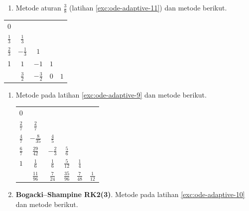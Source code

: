 \begin{enumerate}
\begin{enumerate}
\begin{center}
\begin{tabular}{c|ccc}
0 &  &  & \tabularnewline
$\frac{1}{3}$ & $\frac{1}{3}$ &  & \tabularnewline
$\frac{2}{3}$ & $-\frac{1}{3}$ & $1$ & \tabularnewline
\hline 
 & $0$ & $\frac{1}{2}$ & $\frac{1}{2}$\tabularnewline
\end{tabular}
\par\end{center}
\item \label{exc:ode-adaptive-18}Metode aturan $\frac{3}{8}$ (latihan
\ref{exc:ode-adaptive-11}) dan metode berikut.
\end{enumerate}
\begin{center}
\begin{tabular}{c|cccc}
0 &  &  &  & \tabularnewline
$\frac{1}{3}$ & $\frac{1}{3}$ &  &  & \tabularnewline
$\frac{2}{3}$ & $-\frac{1}{3}$ & $1$ &  & \tabularnewline
1 & $1$ & $-1$ & $1$ & \tabularnewline
\hline 
 & $\frac{3}{2}$ & $-\frac{3}{2}$ & $0$ & $1$\tabularnewline
\end{tabular}
\par\end{center}
\begin{enumerate}
\item \label{exc:ode-adaptive-19}Metode pada latihan \ref{exc:ode-adaptive-9}
dan metode berikut.

\begin{center}
\begin{tabular}{c|ccccc}
0 &  &  &  &  & \tabularnewline
$\frac{2}{7}$ & $\frac{2}{7}$ &  &  &  & \tabularnewline
$\frac{4}{7}$ & $-\frac{8}{35}$ & $\frac{4}{5}$ &  &  & \tabularnewline
$\frac{6}{7}$ & $\frac{29}{42}$ & $-\frac{2}{3}$ & $\frac{5}{6}$ &  & \tabularnewline
$1$ & $\frac{1}{6}$ & $\frac{1}{6}$ & $\frac{5}{12}$ & $\frac{1}{4}$ & \tabularnewline
\hline 
 & $\frac{11}{96}$ & $\frac{7}{24}$ & $\frac{35}{96}$ & $\frac{7}{48}$ & $\frac{1}{12}$\tabularnewline
\end{tabular}
\par\end{center}
\item \label{exc:ode-adaptive-20}\textbf{Bogacki--Shampine RK2(3)}.
Metode pada latihan \ref{exc:ode-adaptive-10} dan metode berikut. \hasasolution 


\end{enumerate}
\end{enumerate}
